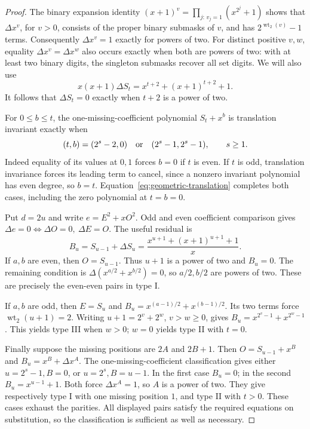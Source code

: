 \documentclass[11pt]{article}
\theoremstyle{definition}
\theoremstyle{remark}
\begin{document}
\begin{proof}
The binary expansion identity
$(x+1)^v=\prod_{j:\,v_j=1}(x^{2^j}+1)$ shows that
$\Delta x^v$, for $v>0$, consists of the proper binary submasks
of $v$, and has $2^{\operatorname{wt}_2(v)}-1$ terms.
Consequently $\Delta x^v=1$ exactly for powers of two.
For distinct positive $v,w$, equality $\Delta x^v=\Delta x^w$
also occurs exactly when both are powers of two: with at least
two binary digits, the singleton submasks recover all set digits.
We will also use
\begin{equation}\label{eq:geometric-translation}
 x(x+1)\Delta S_t=x^{t+2}+(x+1)^{t+2}+1.
\end{equation}
It follows that $\Delta S_t=0$ exactly when $t+2$ is a power of two.

For $0\le b\le t$, the one-missing-coefficient polynomial
$S_t+x^b$ is translation invariant exactly when
\[
 (t,b)=(2^s-2,0)\quad\hbox{or}\quad(2^s-1,2^s-1),\qquad s\ge1.
\]
Indeed equality of its values at $0,1$ forces $b=0$ if $t$ is even.
If $t$ is odd, translation invariance forces its leading term to
cancel, since a nonzero invariant polynomial has even degree, so
$b=t$. Equation~\eqref{eq:geometric-translation} completes both cases,
including the zero polynomial at $t=b=0$.

Put $d=2u$ and write $e=E^2+xO^2$.
Odd and even coefficient comparison gives
$\Delta e=0\Longleftrightarrow\Delta O=0,\ \Delta E=O$.
The useful residual is
\[
 B_u=S_{u-1}+\Delta S_u
     =\frac{x^{u+1}+(x+1)^{u+1}+1}{x}.
\]
If $a,b$ are even, then $O=S_{u-1}$. Thus $u+1$ is a power
of two and $B_u=0$. The remaining condition is
$\Delta(x^{a/2}+x^{b/2})=0$, so $a/2,b/2$ are powers of two.
These are precisely the even-even pairs in type I.

If $a,b$ are odd, then $E=S_u$ and
$B_u=x^{(a-1)/2}+x^{(b-1)/2}$. Its two terms force
$\operatorname{wt}_2(u+1)=2$. Writing $u+1=2^v+2^w$, $v>w\ge0$,
gives $B_u=x^{2^v-1}+x^{2^w-1}$. This yields type III when $w>0$;
$w=0$ yields type II with $t=0$.

Finally suppose the missing positions are $2A$ and $2B+1$.
Then $O=S_{u-1}+x^B$ and $B_u=x^B+\Delta x^A$.
The one-missing-coefficient classification gives either
$u=2^s-1,B=0$, or $u=2^s,B=u-1$.
In the first case $B_u=0$; in the second $B_u=x^{u-1}+1$.
Both force $\Delta x^A=1$, so $A$ is a power of two.
They give respectively type I with one missing position $1$,
and type II with $t>0$. These cases exhaust the parities.
All displayed pairs satisfy the required equations on substitution,
so the classification is sufficient as well as necessary.
\end{proof}
\end{document}
